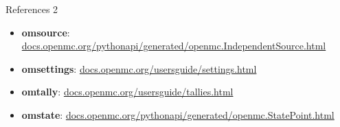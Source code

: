 \documentclass[aspectratio=169,11pt]{beamer}
\begin{document}
\begin{frame}[t]{References 2}
\fontsize{9}{12}\selectfont\begin{itemize}\setlength{\itemsep}{3mm}
\item \textbf{omsource}: \href{https://docs.openmc.org/en/stable/pythonapi/generated/openmc.IndependentSource.html}{docs.openmc.org/pythonapi/generated/openmc.IndependentSource.html}
\item \textbf{omsettings}: \href{https://docs.openmc.org/en/stable/usersguide/settings.html}{docs.openmc.org/usersguide/settings.html}
\item \textbf{omtally}: \href{https://docs.openmc.org/en/stable/usersguide/tallies.html}{docs.openmc.org/usersguide/tallies.html}
\item \textbf{omstate}: \href{https://docs.openmc.org/en/stable/pythonapi/generated/openmc.StatePoint.html}{docs.openmc.org/pythonapi/generated/openmc.StatePoint.html}
\end{itemize}\end{frame}
\end{document}
